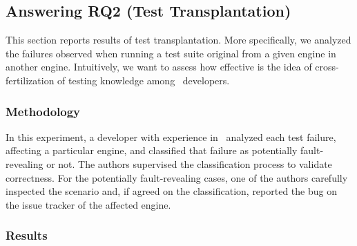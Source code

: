 \documentclass[sigconf,review, anonymous]{acmart}
\begin{document}
\begin{center}
\end{center}


\subsection{Answering RQ2 (Test Transplantation)}
\label{sec:transplantation}

This section reports results of test transplantation. More
specifically, we analyzed the failures observed when running a test
suite original from a given engine in another engine. Intuitively, we
want to assess how effective is the idea of cross-fertilization of
testing knowledge among \js\ developers.

\subsubsection{Methodology}
\label{sec:methodology}
In this experiment, a developer with experience in \js\ analyzed each
test failure, affecting a particular engine, and classified that
failure as potentially fault-revealing or not. The authors supervised
the classification process to validate correctness. For the
potentially fault-revealing cases, one of the authors carefully
inspected the scenario and, if agreed on the classification, reported
the bug on the issue tracker of the affected engine.


\subsubsection{Results}
\label{sec:results}
\end{document}
